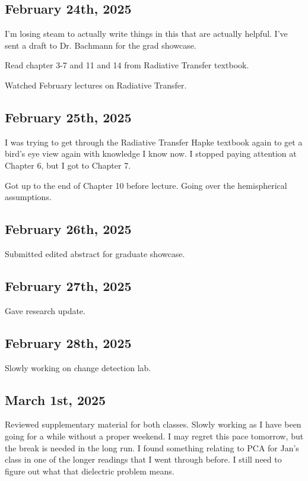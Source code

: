 \documentclass{article}
\begin{document}
\subsection{February 24th, 2025}
I'm losing steam to actually write things in this that are actually helpful. I've sent a draft to Dr. Bachmann for the grad showcase. 

Read chapter 3-7 and 11 and 14 from Radiative Transfer textbook. 

Watched February lectures on Radiative Transfer. 

\subsection{February 25th, 2025}
I was trying to get through the Radiative Transfer Hapke textbook again to get a bird's eye view again with knowledge I know now. I stopped paying attention at Chapter 6, but I got to Chapter 7. 

Got up to the end of Chapter 10 before lecture. 
Going over the hemispherical assumptions. 

\subsection{February 26th, 2025}
Submitted edited abstract for graduate showcase. 

\subsection{February 27th, 2025}
Gave research update. 

\subsection{February 28th, 2025}
Slowly working on change detection lab. 

\subsection{March 1st, 2025}
Reviewed supplementary material for both classes. Slowly working as I have been going for a while without a proper weekend. I may regret this pace tomorrow, but the break is needed in the long run. I found something relating to PCA for Jan's class in one of the longer readings that I went through before. I still need to figure out what that dielectric problem means. 
\end{document}
